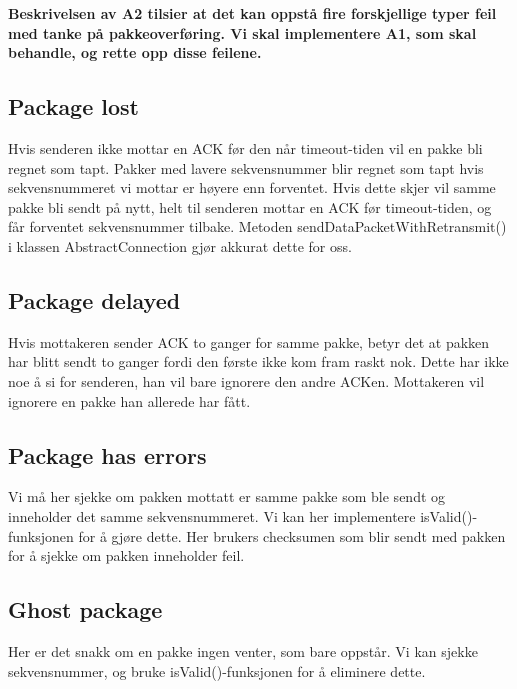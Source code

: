 \textbf{Beskrivelsen av A2 tilsier at det kan oppstå fire forskjellige typer feil med tanke på pakkeoverføring. Vi skal implementere A1, som skal behandle, og rette opp disse feilene.}

\subsection{Package lost}
Hvis senderen ikke mottar en ACK før den når timeout-tiden vil en pakke bli regnet som tapt.
Pakker med lavere sekvensnummer blir regnet som tapt hvis sekvensnummeret vi mottar er høyere enn forventet. 
Hvis dette skjer vil samme pakke bli sendt på nytt, helt til senderen mottar en ACK før timeout-tiden, og får forventet sekvensnummer tilbake.
Metoden sendDataPacketWithRetransmit() i klassen AbstractConnection gjør akkurat dette for oss. 

\subsection{Package delayed}
Hvis mottakeren sender ACK to ganger for samme pakke, betyr det at pakken har blitt sendt to ganger fordi den første ikke kom fram raskt nok.
Dette har ikke noe å si for senderen, han vil bare ignorere den andre ACKen. Mottakeren vil ignorere en pakke han allerede har fått. 
 
\subsection{Package has errors}
Vi må her sjekke om pakken mottatt er samme pakke som ble sendt og inneholder det samme sekvensnummeret. Vi kan her implementere isValid()-funksjonen for å gjøre dette. Her brukers checksumen som blir sendt med pakken for å sjekke om pakken inneholder feil.
 
\subsection{Ghost package}
Her er det snakk om en pakke ingen venter, som bare oppstår. Vi kan sjekke sekvensnummer, og bruke isValid()-funksjonen for å eliminere dette. 